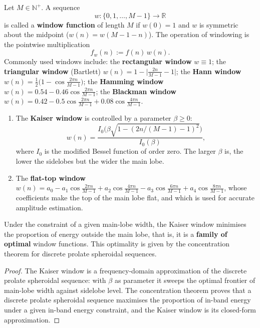 \begin{definition}\label{def:window_function}
Let $M\in\mathbb{N}^+$. A sequence
\[
w:\{0,1,\dots,M-1\}\to\mathbb{R}
\]
is called a \textbf{window function} of length $M$ if $w(0)=1$ and $w$ is symmetric about the midpoint ($w(n)=w(M-1-n)$). The operation of windowing is the pointwise multiplication
\[
f_w(n):=f(n)\,w(n).
\]
Commonly used windows include: the \textbf{rectangular window} $w\equiv1$; the \textbf{triangular window} (Bartlett) $w(n)=1-\big|\frac{2n}{M-1}-1\big|$; the \textbf{Hann window} $w(n)=\frac12\big(1-\cos\frac{2\pi n}{M-1}\big)$; the \textbf{Hamming window} $w(n)=0.54-0.46\cos\frac{2\pi n}{M-1}$; the \textbf{Blackman window} $w(n)=0.42-0.5\cos\frac{2\pi n}{M-1}+0.08\cos\frac{4\pi n}{M-1}$.
\end{definition}

\begin{definition}\label{def:kaiser_flat_top_window}
\begin{enumerate}[label=(\roman*)]
    \item The \textbf{Kaiser window} is controlled by a parameter $\beta\ge0$:
    \[
    w(n)=\frac{I_0\big(\beta\sqrt{1-(2n/(M-1)-1)^2}\big)}{I_0(\beta)},
    \]
    where $I_0$ is the modified Bessel function of order zero. The larger $\beta$ is, the lower the sidelobes but the wider the main lobe.
    \item The \textbf{flat-top window} $w(n)=a_0-a_1\cos\frac{2\pi n}{M-1}+a_2\cos\frac{4\pi n}{M-1}-a_3\cos\frac{6\pi n}{M-1}+a_4\cos\frac{8\pi n}{M-1}$, whose coefficients make the top of the main lobe flat, and which is used for accurate amplitude estimation.
\end{enumerate}
\end{definition}

\begin{property}\label{prop:kaiser_optimality}
Under the constraint of a given main-lobe width, the Kaiser window minimises the proportion of energy outside the main lobe, that is, it is a \textbf{family of optimal} window functions. This optimality is given by the concentration theorem for discrete prolate spheroidal sequences.
\end{property}

\begin{proof}
The Kaiser window is a frequency-domain approximation of the discrete prolate spheroidal sequence: with $\beta$ as parameter it sweeps the optimal frontier of main-lobe width against sidelobe level. The concentration theorem proves that a discrete prolate spheroidal sequence maximises the proportion of in-band energy under a given in-band energy constraint, and the Kaiser window is its closed-form approximation.
\end{proof}

